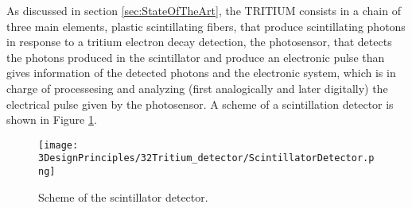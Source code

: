 As discussed in section \ref{sec:StateOfTheArt}, the TRITIUM consists in a chain of three main elements, plastic scintillating fibers, that produce scintillating photons in response to a tritium electron decay detection, the photosensor, that detects the photons produced in the scintillator and produce an electronic pulse than gives information of the detected photons and the electronic system, which is in charge of processesing and analyzing (first analogically and later digitally) the electrical pulse given by the photosensor. A scheme of a scintillation detector is shown in Figure \ref{fig:ScintillatorDetector}.

\begin{figure}[hbtp]
\texttt{[image: 3DesignPrinciples/32Tritium\_detector/ScintillatorDetector.png]}
\centering
\caption{Scheme of the scintillator detector.\label{fig:ScintillatorDetector}}
\end{figure}

